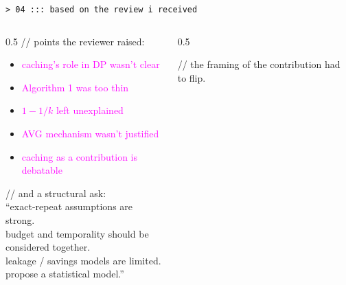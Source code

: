 \documentclass[aspectratio=169,10pt]{beamer}
\newcommand{\hi}[1]{\textcolor{neon}{#1}}
\newcommand{\hilo}[1]{\textcolor{magenta}{#1}}
\begin{document}
\begin{frame}{\texttt{> 04 ::: based on the review i received}}

\begin{columns}[T,onlytextwidth]
\begin{column}{0.5\textwidth}
{\color{cyan}\ttfamily // points the reviewer raised:}
\begin{itemize}
  \item \hilo{caching's role in DP wasn't clear}
  \item \hilo{Algorithm 1 was too thin}
  \item \hilo{$1 - 1/k$ left unexplained}
  \item \hilo{AVG mechanism wasn't justified}
  \item \hilo{caching as a contribution is debatable}
\end{itemize}

\vspace{0.5em}
{\color{cyan}\ttfamily // and a structural ask:}
\vspace{0.2em}\\
{\color{fg}\ttfamily\small
``exact-repeat assumptions are strong. \\
budget and temporality should be \\ considered together. \\
leakage / savings models are limited. \\
\hi{propose a statistical model.}''}
\end{column}

\begin{column}{0.5\textwidth}
\centering
{}

\vspace{0.6em}
{\color{dim}\ttfamily\small // the framing of the contribution had to flip.}
\end{column}
\end{columns}

\end{frame}
\end{document}
